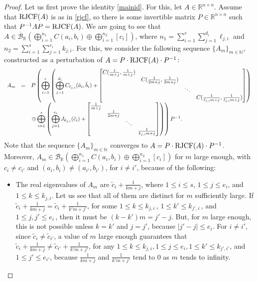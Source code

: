 \documentclass[a4paper]{article}
\newcommand{\R}{\mathbb R}
\newcommand{\bunr}{{\mathcal B}_{\R}}
\newcommand{\cbunr}{{\overline{\mathcal B}}_{\R}}
\begin{document}
\begin{proof}
    Let us first prove the identity \eqref{mainid}. For this, let $A\in\R^{n\times n}$. Assume that ${\rm RJCF}(A)$ is as in \eqref{rjcf}, so there is some invertible matrix $P\in\R^{n\times n}$ such that $P^{-1}AP={\rm RJCF}(A)$. We are going to see that $A\in \cbunr \left(\bigoplus_{i=1}^{n_1}C(a_i,b_i)\oplus \bigoplus_{i=1}^{n_2}[c_i]\right)$, where $n_1=\sum_{i=1}^r\sum_{j=1}^{d_i}\ell_{j,i}$ and $n_2=\sum_{i=1}^s\sum_{j=1}^{e_i}k_{j,i}$. For this, we consider the following sequence $\{ A_m \}_{m \in \mathbb{N}}$, constructed as a perturbation of $A = P\cdot{\rm RJCF}(A)\cdot P^{-1}$:
    $$
    \begin{array}{ccl}
    A_m&=&P\left(\displaystyle\displaystyle\bigoplus_{i=1}^r\left(\bigoplus_{j=1}^{d_i}C_{\ell_{j,i}}(\tilde a_i, \tilde b_i)+\begin{bmatrix}
        C(\frac{1}{m+j},\frac{1}{m+j})\\&C(\frac{1}{2m+j},\frac{1}{2m+j})\\&&\ddots\\&&&C(\frac{1}{\ell_{j,i}m+j},\frac{1}{\ell_{j,i}m+j})
    \end{bmatrix}\right)\right.\\&&\left.\displaystyle\oplus \bigoplus_{i=1}^s\left(\bigoplus_{j=1}^{e_i} J_{k_{j,i}} (\tilde c_i) +\begin{bmatrix}
        \frac{1}{m+j}\\&\frac{1}{2m+j}\\&&\ddots\\&&&\frac{1}{k_{j,i}m+j}
    \end{bmatrix}\right)\right)P^{-1}.
    \end{array}
    $$
Note that the sequence $\{A_m\}_{m\in\mathbb N}$ converges to $A = P\cdot {\rm RJCF}(A)\cdot P^{-1}$. Moreover, $A_m\in \bunr \left(\bigoplus_{i=1}^{n_1}C(a_i,b_i)\oplus \bigoplus_{i=1}^{n_2}[c_i]\right)$ for $m$ large enough, with $c_i\neq c_{i'}$ and $(a_i , b_i) \neq (a_{i'}, b_{i'})$, for $i\neq i'$, because of the following:
\begin{itemize}
    \item The real eigenvalues of $A_m$ are $ \tilde c_i+\frac{1}{km+j}$, where $1 \leq i \leq s$, $1\leq j\leq e_i$, and $1\leq k\leq k_{j,i}$. Let us see that all of them are distinct for $m$ sufficiently large. If $\tilde c_i+\frac{1}{km+j}=  \tilde c_i+\frac{1}{k'm+j'}$, for some $1\leq k \leq k_{j,i}\,$,  $1\leq k'\leq k_{j',i}\,$, and $1\leq j,j'\leq e_i\,$, then it must be $(k-k')m=j'-j$. But, for $m$ large enough, this is not possible unless $k=k'$ and $j=j'$, because  $|j'-j|\leq e_i$. For $i\neq i'$, since $\tilde c_i\neq \tilde c_{i'}$, a value of $m$ large enough guarantees that $\tilde c_i+\frac{1}{km+j}\neq \tilde c_{i'}+\frac{1}{k'm+j'}$, for any $1\leq k\leq k_{j,i},1\leq j\leq e_i,1\leq k'\leq k_{j',i'}$, and $1\leq j'\leq e_{i'}$, because $\frac{1}{km+j}$ and $\frac{1}{k'm+j'}$ tend to $0$ as $m$ tends to infinity.

\end{itemize}
\end{proof}
\end{document}
